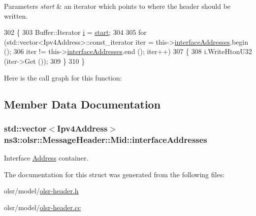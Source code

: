 \begin{DoxyParams}{Parameters}
{\em start} & an iterator which points to where the header should be written. \\
\hline
\end{DoxyParams}

\begin{DoxyCode}
302 \{
303   Buffer::Iterator \hyperlink{bernuolliDistribution_8m_a6f6ccfcf58b31cb6412107d9d5281426}{i} = \hyperlink{namespacevisualizer_1_1core_a2a35e5d8a34af358b508dac8635754e0}{start};
304 
305   \textcolor{keywordflow}{for} (std::vector<Ipv4Address>::const\_iterator iter = this->\hyperlink{structns3_1_1olsr_1_1MessageHeader_1_1Mid_a44009554c4ed0aeb139f7273d42abc68}{interfaceAddresses}.begin ();
306        iter != this->\hyperlink{structns3_1_1olsr_1_1MessageHeader_1_1Mid_a44009554c4ed0aeb139f7273d42abc68}{interfaceAddresses}.end (); iter++)
307     \{
308       i.WriteHtonU32 (iter->Get ());
309     \}
310 \}
\end{DoxyCode}


Here is the call graph for this function\+:




\subsection{Member Data Documentation}
\subsubsection[{\texorpdfstring{interface\+Addresses}{interfaceAddresses}}]{\setlength{\rightskip}{0pt plus 5cm}std\+::vector$<${\bf Ipv4\+Address}$>$ ns3\+::olsr\+::\+Message\+Header\+::\+Mid\+::interface\+Addresses}\hypertarget{structns3_1_1olsr_1_1MessageHeader_1_1Mid_a44009554c4ed0aeb139f7273d42abc68}{}\label{structns3_1_1olsr_1_1MessageHeader_1_1Mid_a44009554c4ed0aeb139f7273d42abc68}


Interface \hyperlink{classns3_1_1Address}{Address} container. 



The documentation for this struct was generated from the following files\+:\begin{DoxyCompactItemize}
\item 
olsr/model/\hyperlink{olsr-header_8h}{olsr-\/header.\+h}\item 
olsr/model/\hyperlink{olsr-header_8cc}{olsr-\/header.\+cc}\end{DoxyCompactItemize}
